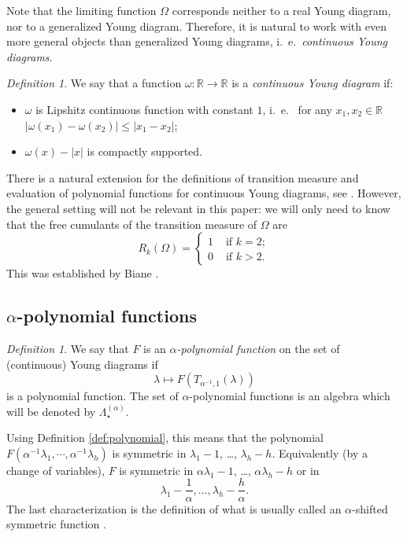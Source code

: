 \documentclass[11pt]{amsart}
\theoremstyle{plain}
\theoremstyle{remark}
\newtheorem{definition}[lemma]{Definition}
\newcommand{\RR}{\mathbb{R}}
\newcommand{\Pola}{\Lambda_\star^{(\alpha)}}
\begin{document}
Note that the limiting function $\Omega$ corresponds neither to a real Young diagram,
nor to a generalized Young diagram.
Therefore, it is natural to work with even more general objects than generalized Young diagrams, i.~e.~\emph{continuous Young diagrams}. 
\begin{definition}
We say that a function $\omega: \RR \rightarrow \RR$ is a \emph{continuous Young diagram} if:
\begin{itemize}
\item $\omega$ is Lipshitz continuous function with constant $1$, i.~e.~ for any $x_1, x_2 \in \RR$ $|\omega(x_1) - \omega(x_2)| \leq |x_1 - x_2|$;
\item $\omega(x)-|x|$ is compactly supported.
\end{itemize}
\end{definition}
There is a natural extension for the definitions of transition measure and evaluation of polynomial functions for continuous Young diagrams, see \cite[Section 1.2]{Biane1998}.
However, the general setting will not be relevant in this paper:
we will only need to know that the free
cumulants of the transition measure of $\Omega$ are
\[R_k(\Omega) = \begin{cases}
    1 &\text{ if }k=2 ;\\
    0 &\text{ if }k>2.
\end{cases}\]
This was established by Biane \cite[Section 3.1]{Biane2001}.

\subsection{$\alpha$-polynomial functions}
\begin{definition}
    We say that $F$ is an \emph{$\alpha$-polynomial function} on the set of
(continuous) Young diagrams if 
    \[\lambda \mapsto F ( T_{\alpha^{-1},1}(\lambda) ) \]
    is a polynomial function.
    The set of $\alpha$-polynomial functions is an algebra which will be denoted by $\Pola$.
\end{definition}
Using Definition \ref{def:polynomial}, this means
that the polynomial $F(\alpha^{-1} \lambda_1, \cdots, \alpha^{-1} \lambda_h)$ is 
symmetric in $\lambda_1 -1$, \ldots, $\lambda_h - h$.
Equivalently (by a change of variables), $F$ is symmetric in $\alpha \lambda_1 -1$,
\ldots, $\alpha \lambda_h - h$ or in 
\[\lambda_1 -\frac{1}{\alpha}, \dots, \lambda_h - \frac{h}{\alpha}.\]
The last characterization is the definition of what is usually called an
$\alpha$-shifted symmetric function \cite{OkounkovOlshanskiShiftedJack,Lassalle2008a}.
\end{document}
